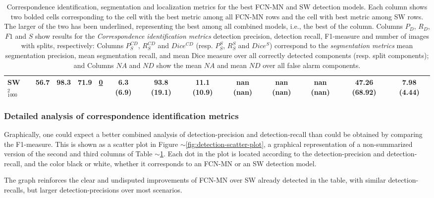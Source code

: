 \documentclass[a4paper,authoryear,review]{elsarticle}
\begin{document}
\begin{table}[]
\begin{adjustbox}{angle=90}
{\begin{tabular}{lcccccccccccc}
                SW$_{1000}^{2}$ & 56.7 & 98.3 & 71.9 & {\ul \textbf{0}} & 6.3 (6.9) & 93.8 (19.1) & 11.1 (10.9) & nan (nan) & nan (nan) & nan (nan) & 47.26 (68.92) & 7.98 (4.44) \\ \hline
            \end{tabular}     
        }
    \end{adjustbox}
     \caption{
Correspondence identification, segmentation and localization metrics for the best FCN-MN and SW detection models.   Each column shows two bolded cells corresponding to the cell with the best metric among all FCN-MN rows and the cell with best metric among SW rows. The larger of the two has been underlined, representing the best among all combined models, i.e., the best of the column.  Columns $P_D$, $R_D$, $F1$ and $S$ show results for the \emph{Correspondence identification metrics} detection precision, detection recall, F1-measure and number of images with splits, respectively: Columns $P_S^{CD}$, $R_S^{CD}$ and $Dice^{CD}$ (resp. $P_S^S$, $R_S^S$ and $Dice^S$) correspond to the \emph{segmentation metrics} mean segmentation precision, mean segmentation recall, and mean Dice measure over all correctly detected components (resp. split components); and Columns $NA$ and $ND$ show the mean $NA$ and mean $ND$ over all false alarm components.
    }
        \label{tab:TablaXX}
\end{table}


\subsubsection{Detailed analysis of correspondence identification metrics}
\label{sub:compFCNSW}

Graphically, one could expect a better combined analysis of detection-precision and detection-recall than could be obtained by comparing the F1-measure. This is shown as a scatter plot in Figure $\sim$\ref{fig:detection-scatter-plot}, a graphical representation of a non-summarized version of the second and third columns of Table $\sim$\ref{tab:TablaXX}. Each dot  in the plot is located according to the detection-precision and detection-recall, and the color black or white, whether it corresponds to an FCN-MN or an SW detection model.

The graph reinforces the clear and undisputed improvements of FCN-MN over SW already detected in the table, with similar detection-recalls, but larger detection-precisions over most scenarios. 
\end{document}
